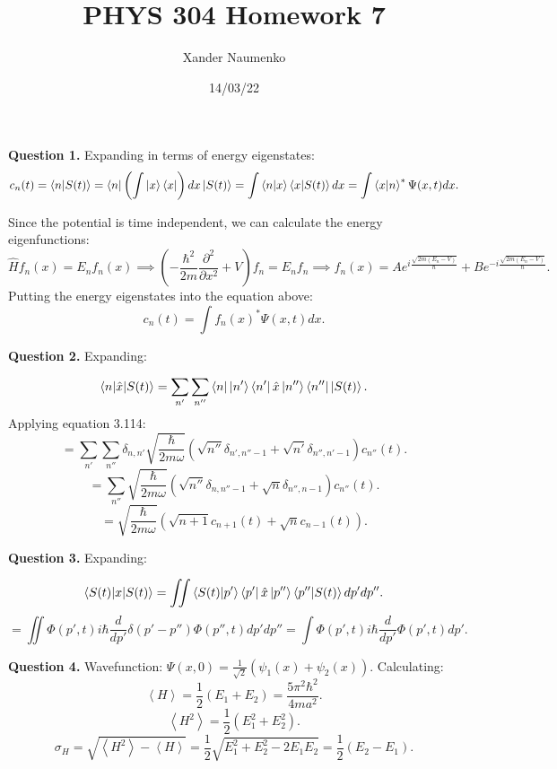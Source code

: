 \documentclass[letterpaper, reqno,11pt]{article}
\begin{document}
\title{PHYS 304 Homework 7}
\date{14/03/22}
\author{Xander Naumenko}
\maketitle

{\noindent\bf Question 1.} Expanding in terms of energy eigenstates: 
\[
c_n(t)=\braket {n|S(t)}=\bra n\left(\int \ket x \bra x\right)dx\ket{S(t)}=\int \braket{n|x}\braket{x|S(t)}dx=\int\braket {x|n}^*\Psi(x, t)dx
.\]

Since the potential is time independent, we can calculate the energy eigenfunctions: 
\[
\hat{H} f_n(x)=E_n f_n(x)\implies \left(-\frac{\hbar^2}{2m}\frac{\partial^2}{\partial x^2}+V\right)  f_n=E_n f_n\implies f_n(x)=Ae^{i\frac{\sqrt{2m(E_n-V)} }{\hbar}}+Be^{-i\frac{\sqrt{2m(E_n-V)} }{\hbar}}
.\]
Putting the energy eigenstates into the equation above: 
\[
c_n(t)=\int f_n(x)^*\Psi(x, t)dx
.\]

{\noindent\bf Question 2.} Expanding: 

\[
\braket{n|\hat{x}|S(t)}=\sum_{n'}\sum_{n''} \bra n \ket {n'}\bra {n'} \hat{x}\ket {n''}\bra {n''}\ket{S(t)} 
.\]
Applying equation 3.114: 
\[
=\sum_{n'}\sum_{n''}\delta_{n, n'}\sqrt{\frac{\hbar}{2m\omega}}\left( \sqrt{n''}\delta_{n', n''-1}+\sqrt{n'} \delta_{n'', n'-1}  \right) c_{n''}(t) 
.\]
\[
=\sum_{n''}\sqrt{\frac{\hbar}{2m\omega}}\left( \sqrt{n''}\delta_{n, n''-1}+\sqrt{n} \delta_{n'', n-1}  \right) c_{n''}(t)
.\]
\[
=\sqrt{\frac{\hbar}{2m\omega}}\left( \sqrt{n+1}c_{n+1}(t)+\sqrt{n} c_{n-1}(t)  \right)
.\]

{\noindent\bf Question 3.} Expanding: 

\[
\braket{S(t)|x|S(t)}=\iint \braket{S(t)|p'}\bra {p'} \hat{x} \ket {p''}\braket{p''|S(t)}dp'dp''
.\]
\[
=\iint \Phi(p', t)i\hbar \frac{d}{dp'}\delta(p'-p'')\Phi(p'', t) dp'dp''=\int\Phi(p', t)i\hbar \frac{d}{dp'}\Phi(p', t)dp'
.\]

{\noindent\bf Question 4.} Wavefunction: $\Psi(x,0)=\frac{1}{\sqrt{2} }\left( \psi_1(x)+\psi_2(x) \right) $. Calculating: 
\[
\left<H \right>=\frac{1}{2}\left( E_1+E_2 \right)=\frac{5\pi^2\hbar^2}{4ma^2}
.\]
\[
\left<H^2 \right>=\frac{1}{2}\left( E_1^2+E_2^2 \right) 
.\]
\[
\sigma_H=\sqrt{\left<H^2 \right>-\left<H \right>}=\frac{1}{2}\sqrt{E_1^2+E_2^2-2E_1E_2}=\frac{1}{2}(E_2-E_1)   
.\]
\end{document}
